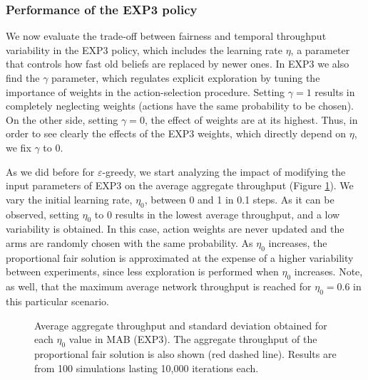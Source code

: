 \documentclass[preprint,12pt]{elsarticle}
\begin{document}
\subsubsection{Performance of the EXP3 policy}
\label{section:exp3_study}
We now evaluate the trade-off between fairness and temporal throughput variability in the EXP3 policy, which includes the learning rate $\eta$, a parameter that controls how fast old beliefs are replaced by newer ones. In EXP3 we also find the $\gamma$ parameter, which regulates explicit exploration by tuning the importance of weights in the action-selection procedure. Setting $\gamma = 1$ results in completely neglecting weights (actions have the same probability to be chosen). On the other side, setting $\gamma = 0$, the effect of weights are  at its highest. Thus, in order to see clearly the effects of the EXP3 weights, which directly depend on $\eta$, we fix $\gamma$ to 0.

As we did before for $\varepsilon$-greedy, we start analyzing the impact of modifying the input parameters of EXP3 on the average aggregate throughput (Figure \ref{fig:exp3_tuning_parameters}). We vary the initial learning rate, $\eta_0$, between 0 and 1 in 0.1 steps. As it can be observed, setting $\eta_0$ to 0 results in the lowest average throughput, and a low variability is obtained. In this case, action weights are never updated and the arms are randomly chosen with the same probability. As $\eta_0$ increases, the proportional fair solution is approximated at the expense of a higher variability between experiments, since less exploration is performed when $\eta_0$ increases. Note, as well, that the maximum average network throughput is reached for $\eta_0 = 0.6$ in this particular scenario.

\begin{figure}[t!]
	\centering											
	\caption{Average aggregate throughput and standard deviation obtained for each $\eta_0$ value in MAB (EXP3). The aggregate throughput of the proportional fair solution is also shown (red dashed line). Results are from 100 simulations lasting 10,000 iterations each.}
	\label{fig:exp3_tuning_parameters}
\end{figure}	
\end{document}
